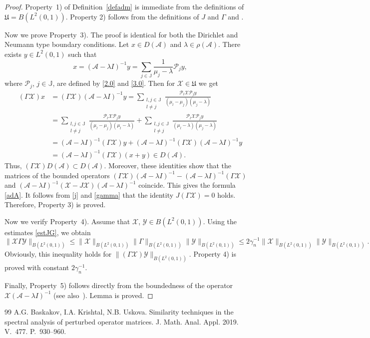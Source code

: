 \documentclass[10pt,a4paper]{amsart}
\begin{document}
\begin{proof}
Property~1) of Definition~\ref{defadm} is immediate from the definitions of
$\mathfrak{U}=B(L^2(0, 1))$. Property 2) follows from the definitions of $J$ and $\Gamma$
and \cite[Lemma~3.4]{BaskKrUsk}.

Now we prove Property~3). The proof is identical for both the Dirichlet and Neumann type boundary conditions.
Let $x\in D(\mathcal{A})$ and $\lambda\in\rho(\mathcal{A})$. There exists
$y\in L^2(0, 1)$ such that
\[
x=(\mathcal{A}-\lambda I)^{-1}y=\sum_{j\in\mathbb{J}}\frac{1}{\mu_j-\lambda}\mathcal{P}_jy,
\]
where $\mathcal{P}_j$, $j\in\mathbb{J}$, are defined by \eqref{2.0} and \eqref{3.0}. Then
for $\mathcal{X}\in\mathfrak{U}$ we get
\begin{align*}
(\Gamma\mathcal{X})x &= (\Gamma\mathcal{X})(\mathcal{A}-\lambda I)^{-1}y=
\sum\limits_{\substack{l, j\in\mathbb{J} \\ l\ne j}}
\frac{\mathcal{P}_l\mathcal{X}\mathcal{P}_jy}{(\mu_l-\mu_j)(\mu_j-\lambda)} \\
&= \sum\limits_{\substack{l, j\in\mathbb{J} \\ l\ne j}}
\frac{\mathcal{P}_l\mathcal{X}\mathcal{P}_jy}{(\mu_l-\mu_j)(\mu_l-\lambda)}+
\sum\limits_{\substack{l, j\in\mathbb{J} \\ l\ne j}}
\frac{\mathcal{P}_l\mathcal{X}\mathcal{P}_jy}{(\mu_l-\lambda)(\mu_j-\lambda)} \\
&= (\mathcal{A}-\lambda I)^{-1}(\Gamma\mathcal{X})y+(\mathcal{A}-\lambda I)^{-1}
(\Gamma\mathcal{X})(\mathcal{A}-\lambda I)^{-1}y \\
&= (\mathcal{A}-\lambda I)^{-1}(\Gamma\mathcal{X})(x+y)\in D(\mathcal{A}).
\end{align*}
Thus, $(\Gamma\mathcal{X})D(\mathcal{A})\subset D(\mathcal{A})$. Moreover,
these identities show that the matrices of the bounded operators
$(\Gamma\mathcal{X})(\mathcal{A}-\lambda I)^{-1}
-(\mathcal{A}-\lambda I)^{-1}(\Gamma\mathcal{X})$ and $(\mathcal{A}-\lambda
I)^{-1}(\mathcal{X}-J\mathcal{X})(\mathcal{A}-\lambda I)^{-1}$ coincide.
This gives the formula \eqref{adA}. It follows from \eqref{j} and \eqref{gamma}
that the identity $J(\Gamma\mathcal{X})=0$ holds. Therefore, Property 3) is proved.

Now we verify Property~4). Assume that $\mathcal{X}$, $\mathcal{Y}\in B(L^2(0, 1))$.
Using the estimates \eqref{estJG}, we obtain
\[
\|\mathcal{X}\Gamma\mathcal{Y}\|_{B(L^2(0, 1))}\leqslant \|\mathcal{X}\|_{B(L^2(0, 1))}
\|\Gamma\|_{B(L^2(0, 1))}\|\mathcal{Y}\|_{B(L^2(0, 1))}\leqslant
2\gamma_n^{-1}\|\mathcal{X}\|_{B(L^2(0, 1))}\|\mathcal{Y}\|_{B(L^2(0, 1))}.
\]
Obviously, this inequality holds for $\|(\Gamma\mathcal{X})\mathcal{Y}\|_{B(L^2(0, 1))}$.
Property 4) is proved with constant $2\gamma_n^{-1}$.

Finally, Property~5) follows directly from the boundedness of the operator
$\mathcal{X}(\mathcal{A}-\lambda I)^{-1}$ (see also~\cite[Definition~2.1]{BaskKrUsk}).
Lemma is proved.
\end{proof}

\begin{thebibliography}{99}
 A.G. Baskakov, I.A. Krishtal, N.B. Uskova. Similarity techniques in the spectral analysis of perturbed operator matrices. J. Math. Anal. Appl. 2019. V.~477. P.~930--960.
\end{thebibliography}
\end{document}
